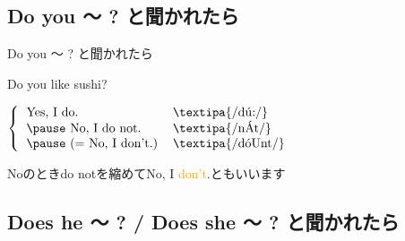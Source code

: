 \documentclass[aspectratio=169]{beamer}
\newcommand{\myaudio}[1]{\href{#1}{\faVolumeUp}}
\begin{document}
\subsection{Do you 〜 ? と聞かれたら}
 \begin{frame}[plain]{Do you 〜 ? と聞かれたら}
 \Large
\pause

Do you like sushi?\hfill{}

\vspace{20pt}
\pause

\mbox{}\hspace{100pt}$\left\{\begin{tabular}{ll}
         \text{Yes, I do.}&\text{\textipa{/d\'u:/}}\\\pause
         \text{No, I do not.}&\text{\textipa{/n\'At/}}\\\pause
         \text{(}= \text{No, I don't.)}&\text{\textipa{/d\'oUnt/}}
        \end{tabular}\right.$

\pause

\mbox{}\hfill{}{\small Noのときdo notを縮めてNo, I \textcolor{orange}{don't}.ともいいます}

\pause
\mbox{}\hfill\myaudio{./audio/011_answer_do_01.mp3}
\end{frame}

\subsection{Does he 〜 ?  / Does she 〜 ? と聞かれたら}
\end{document}
